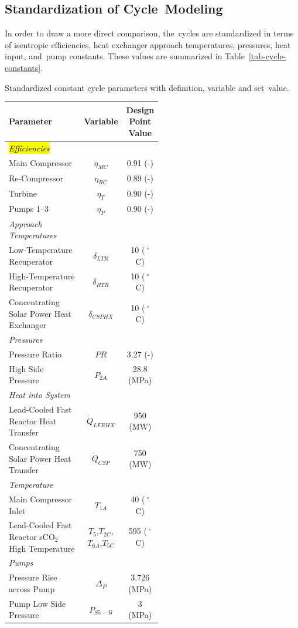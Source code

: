 \documentclass[sustainability,article,accept,moreauthors,pdftex]{Definitions/mdpi}
\begin{document}
\begin{paracol}{2}
\subsection{Standardization of Cycle~Modeling}


In order to draw a more direct comparison, the~cycles are standardized in terms of isentropic efficiencies, heat exchanger approach temperatures, pressures, heat input, and~pump constants. These values are summarized in Table~\ref{tab-cycle-constants}.

\begin{specialtable}[H] 
    \caption{Standardized constant cycle parameters with definition, variable and set~value. \label{tab-cycle-constants}}
    \begin{tabular}{L{0.52\linewidth}cc}
    \toprule
    \textbf{Parameter} & \textbf{Variable}	& \textbf{Design Point Value}\\
    \midrule
    \textit{\hl{Efficiencies} %
}\\
    Main Compressor & $\eta_{MC}$		& 0.91 (-)\\
    Re-Compressor & $\eta_{RC}$		& 0.89 (-)\\
    Turbine & $\eta_{T}$		& 0.90 (-)\\
    Pumps 1--3 & $\eta_{P}$      & 0.90 (-)\\
    \midrule
    \textit{Approach Temperatures}\\
    Low-Temperature Recuperator & $\delta_{LTR}$		& 10 ($~^{\circ}$C)\\
    High-Temperature Recuperator & $\delta_{HTR}$		& 10 ($~^{\circ}$C)\\
    Concentrating Solar Power Heat Exchanger & $\delta_{CSPHX}$	& 10 ($~^{\circ}$C)\\
    \midrule
    \textit{Pressures}\\
    Pressure Ratio & $PR$ & 3.27 (-)\\
    High Side Pressure & $P_{2A}$ & 28.8 (MPa)\\
    \midrule
    \textit{Heat into System}\\
    Lead-Cooled Fast Reactor Heat Transfer & $\dot{Q}_{LFRHX}$ & 950 (MW)\\
    Concentrating Solar Power Heat Transfer & $\dot{Q}_{CSP}$ & 750 (MW)\\
    \midrule
    \textit{Temperature}\\
    Main Compressor Inlet & $T_{1A}$ & 40 ($~^{\circ}$C)\\
    Lead-Cooled Fast Reactor sCO$_{2}$ High Temperature & $T_{5}$,$T_{2C}$,$T_{6A}$,$T_{5C}$ & 595 ($~^{\circ}$C)\\
    \midrule
    \textit{Pumps}\\
    Pressure Rise across Pump & $\Delta_{P}$ & 3.726 (MPa)\\
    Pump Low Side Pressure & $P_{S5-B}$ & 3 (MPa)\\ 
    \bottomrule
    \end{tabular}
\end{specialtable}


\end{paracol}
\end{document}
